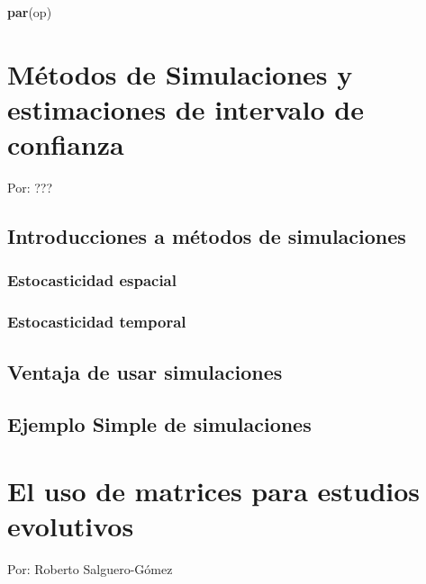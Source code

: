 \documentclass[
]{book}
\newenvironment{Shaded}{\begin{snugshade}}{\end{snugshade}}
\newcommand{\FunctionTok}[1]{\textcolor[rgb]{0.13,0.29,0.53}{\textbf{#1}}}
\newcommand{\NormalTok}[1]{#1}
\theoremstyle{definition}
\theoremstyle{definition}
\theoremstyle{definition}
\theoremstyle{definition}
\theoremstyle{remark}
\begin{document}
\begin{Shaded}
\begin{Highlighting}[]
\FunctionTok{par}\NormalTok{(op)}
\end{Highlighting}
\end{Shaded}

\chapter{Métodos de Simulaciones y estimaciones de intervalo de confianza}\label{muxe9todos-de-simulaciones-y-estimaciones-de-intervalo-de-confianza}

Por: ???

\section{Introducciones a métodos de simulaciones}\label{introducciones-a-muxe9todos-de-simulaciones}

\subsection{Estocasticidad espacial}\label{estocasticidad-espacial}

\subsection{Estocasticidad temporal}\label{estocasticidad-temporal}

\section{Ventaja de usar simulaciones}\label{ventaja-de-usar-simulaciones}

\section{Ejemplo Simple de simulaciones}\label{ejemplo-simple-de-simulaciones}

\chapter{El uso de matrices para estudios evolutivos}\label{el-uso-de-matrices-para-estudios-evolutivos}

Por: Roberto Salguero-Gómez

\section{}\label{section}
\end{document}
